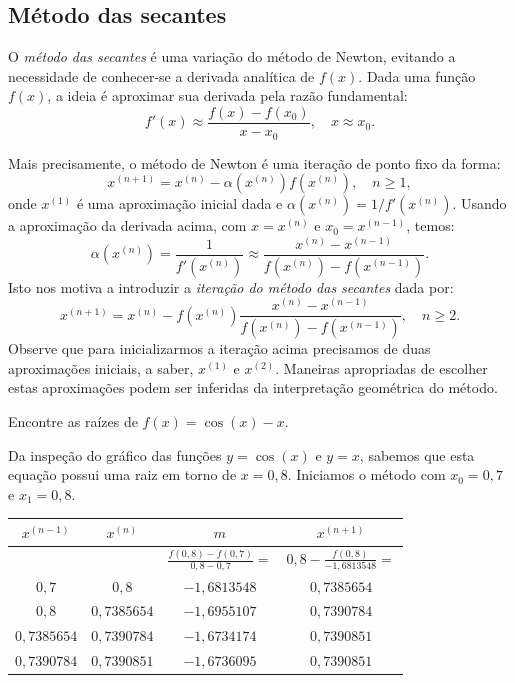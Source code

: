 \begin{ex}
\section{Método das secantes}

O \emph{método das secantes} é uma variação do método de Newton, evitando a necessidade de conhecer-se a derivada analítica de $f(x)$. Dada uma função $f(x)$, a ideia é aproximar sua derivada pela razão fundamental:
\begin{equation}
  f'(x)\approx \frac{f(x)-f(x_0)}{x-x_0},\quad x\approx x_0.
\end{equation}

Mais precisamente, o método de Newton é uma iteração de ponto fixo da forma:
\begin{equation}
  x^{(n+1)} = x^{(n)} - \alpha(x^{(n)})f(x^{(n)}),\quad n\geq 1,
\end{equation}
onde $x^{(1)}$ é uma aproximação inicial dada e $\alpha(x^{(n)}) = 1/f'(x^{(n)})$. Usando a aproximação da derivada acima, com $x = x^{(n)}$ e $x_0 = x^{(n-1)}$, temos:
\begin{equation}
  \alpha(x^{(n)}) = \frac{1}{f'(x^{(n)})} \approx  \frac{x^{(n)} - x^{(n-1)}}{f(x^{(n)}) - f(x^{(n-1)})}.
\end{equation}
Isto nos motiva a introduzir a \emph{iteração do método das secantes} dada por:
\begin{equation}
  x^{(n+1)} = x^{(n)} - f(x^{(n)})\frac{x^{(n)} - x^{(n-1)}}{f(x^{(n)}) - f(x^{(n-1)})},\quad n\geq 2.
\end{equation}
Observe que para inicializarmos a iteração acima precisamos de duas aproximações iniciais, a saber, $x^{(1)}$ e $x^{(2)}$. Maneiras apropriadas de escolher estas aproximações podem ser inferidas da interpretação geométrica do método.

\begin{ex} Encontre as raízes de $f(x)=\cos(x)-x$.
\end{ex}
\begin{sol}
Da inspeção do gráfico das funções $y=\cos(x)$ e $y=x$, sabemos que esta equação possui uma raiz em torno de $x=0,8$. Iniciamos o método com $x_0=0,7$ e $x_1=0,8$.
\begin{center}
\begin{tabular}{|c|c|c|c|}\hline
$x^{(n-1)}$ & $x^{(n)}$ & $m$ & $x^{(n+1)}$\\\hline
 & & $\frac{f(0,8)-f(0,7)}{0,8-0,7} =$ & $0,8- \frac{f(0,8)}{-1,6813548}=$\\
$0,7$ & $0,8$ & $-1,6813548$ & $0,7385654$\\\hline
$0,8$ & $0,7385654$ & $-1,6955107$ & $0,7390784$ \\\hline
 $0,7385654$ & $0,7390784$ &  $-1,6734174$ & $0,7390851$ \\\hline
$0,7390784$ & $0,7390851$ & $-1,6736095$ & $0,7390851$ \\\hline
\end{tabular}
\end{center}
\end{sol}


\end{ex}
